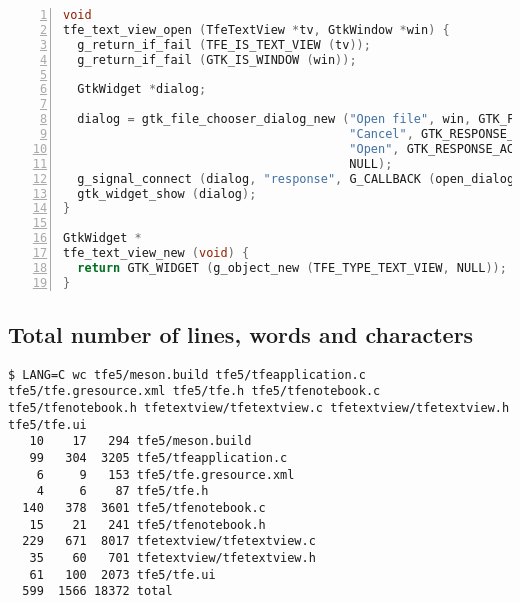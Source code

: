 \begin{lstlisting}[language=C, numbers=left]
void
tfe_text_view_open (TfeTextView *tv, GtkWindow *win) {
  g_return_if_fail (TFE_IS_TEXT_VIEW (tv));
  g_return_if_fail (GTK_IS_WINDOW (win));

  GtkWidget *dialog;

  dialog = gtk_file_chooser_dialog_new ("Open file", win, GTK_FILE_CHOOSER_ACTION_OPEN,
                                        "Cancel", GTK_RESPONSE_CANCEL,
                                        "Open", GTK_RESPONSE_ACCEPT,
                                        NULL);
  g_signal_connect (dialog, "response", G_CALLBACK (open_dialog_response), tv);
  gtk_widget_show (dialog);
}

GtkWidget *
tfe_text_view_new (void) {
  return GTK_WIDGET (g_object_new (TFE_TYPE_TEXT_VIEW, NULL));
}
\end{lstlisting}

\hypertarget{total-number-of-lines-words-and-characters}{%
\subsection{Total number of lines, words and
characters}\label{total-number-of-lines-words-and-characters}}

\begin{lstlisting}
$ LANG=C wc tfe5/meson.build tfe5/tfeapplication.c tfe5/tfe.gresource.xml tfe5/tfe.h tfe5/tfenotebook.c tfe5/tfenotebook.h tfetextview/tfetextview.c tfetextview/tfetextview.h tfe5/tfe.ui
   10    17   294 tfe5/meson.build
   99   304  3205 tfe5/tfeapplication.c
    6     9   153 tfe5/tfe.gresource.xml
    4     6    87 tfe5/tfe.h
  140   378  3601 tfe5/tfenotebook.c
   15    21   241 tfe5/tfenotebook.h
  229   671  8017 tfetextview/tfetextview.c
   35    60   701 tfetextview/tfetextview.h
   61   100  2073 tfe5/tfe.ui
  599  1566 18372 total
\end{lstlisting}
